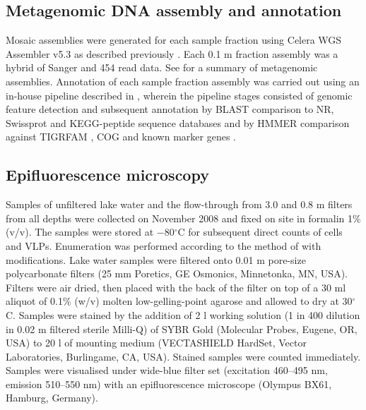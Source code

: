 \subsection{Metagenomic DNA assembly and annotation}
Mosaic assemblies were generated for each sample fraction using Celera \ac{WGS} Assembler v5.3 \cite{Myers2000} as described previously \cite{Ng2010a, Lauro2011}. 
Each 0.1 \textmu{}m fraction assembly was a hybrid of Sanger and 454 read data. 
See  for a summary of metagenomic assemblies.
Annotation of each sample fraction assembly was carried out using an in-house pipeline described in \citet{DeMaere2011}, wherein the pipeline stages consisted of genomic feature detection and subsequent annotation by \ac{BLAST} comparison to \ac{NR}, Swissprot and \ac{KEGG}-peptide sequence databases and by \ac{HMMER} comparison against \ac{TIGRFAM} \cite{Haft2001}, \ac{COG} \cite{Tatusov1997, Tatusov2003} and known marker genes \cite{vonMering2007}. 

\subsection{Epifluorescence microscopy}
Samples of unfiltered lake water and the flow-through from 3.0 and 0.8 \textmu{}m filters from all depths were collected on November 2008 and fixed on site in formalin 1\% (v/v). 
The samples were stored at $-$80$^{\circ}$C for subsequent direct counts of cells and \acp{VLP}. 
Enumeration was performed according to the method of \citet{Patel2007} with modifications. 
Lake water samples were filtered onto 0.01 \textmu{}m pore-size polycarbonate filters (25 mm Poretics, \textsc{GE} Osmonics, Minnetonka, \textsc{MN}, \textsc{USA}). 
Filters were air dried, then placed with the back of the filter on top of a 30 ml aliquot of 0.1\% (w/v) molten low-gelling-point agarose and allowed to dry at 30$^{\circ}$C. 
Samples were stained by the addition of 2 \textmu{}l working solution (1 in 400 dilution in 0.02 \textmu{}m filtered sterile Milli-Q) of \textsc{SYBR} Gold (Molecular Probes, Eugene, \textsc{OR}, \textsc{USA}) to 20 \textmu{}l of mounting medium (\textsc{VECTASHIELD} HardSet, Vector Laboratories, Burlingame, \textsc{CA}, \textsc{USA}). 
Stained samples were counted immediately.
Samples were visualised under wide-blue filter set (excitation 460--495 nm, emission 510--550 nm) with an epifluorescence microscope (Olympus BX61, Hamburg, Germany).

